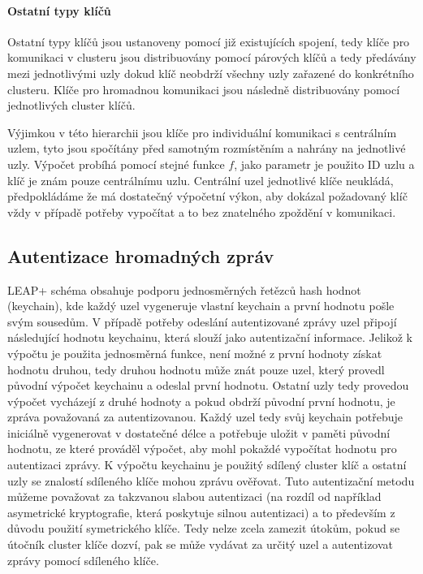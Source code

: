 \documentclass[11pt,final,twoside]{fithesis2}
\begin{document}
\paragraph{Ostatní typy klíčů} 
Ostatní typy klíčů jsou ustanoveny pomocí již existujících spojení, tedy klíče pro komunikaci v clusteru jsou distribuovány pomocí párových klíčů a tedy předávány mezi jednotlivými uzly dokud 
klíč neobdrží všechny uzly zařazené do konkrétního clusteru. Klíče pro hromadnou komunikaci jsou následně distribuovány pomocí jednotlivých cluster klíčů. 

Výjimkou v této hierarchii jsou klíče pro individuální komunikaci s centrálním uzlem, tyto jsou spočítány před samotným rozmístěním a nahrány na jednotlivé uzly. Výpočet probíhá pomocí stejné funkce $f$, 
jako parametr je použito ID uzlu a klíč je znám pouze centrálnímu uzlu. Centrální uzel jednotlivé klíče neukládá, předpokládáme že má dostatečný výpočetní výkon, aby dokázal požadovaný klíč vždy v případě 
potřeby vypočítat a to bez znatelného zpoždění v komunikaci.

\subsection{Autentizace hromadných zpráv}
LEAP+ schéma obsahuje podporu jednosměrných řetězců hash hodnot \cite{Lamport1981} (keychain), kde každý uzel vygeneruje vlastní keychain a první hodnotu pošle svým sousedům. 
V případě potřeby odeslání autentizované zprávy uzel připojí následující hodnotu keychainu, která slouží jako autentizační informace. Jelikož k výpočtu je použita jednosměrná funkce, není možné z první 
hodnoty získat hodnotu druhou, tedy druhou hodnotu může znát pouze uzel, který provedl původní výpočet keychainu a odeslal první hodnotu. Ostatní uzly tedy provedou výpočet vycházejí z druhé hodnoty a pokud 
obdrží původní první hodnotu, je zpráva považovaná za autentizovanou. Každý uzel tedy svůj keychain potřebuje iniciálně vygenerovat v dostatečné délce a potřebuje uložit v paměti původní hodnotu, ze které 
prováděl výpočet, aby mohl pokaždé vypočítat hodnotu pro autentizaci zprávy. K výpočtu keychainu je použitý sdílený cluster klíč a ostatní uzly se znalostí sdíleného klíče mohou zprávu ověřovat.
Tuto autentizační metodu můžeme považovat za takzvanou slabou autentizaci (na rozdíl od například asymetrické kryptografie, která poskytuje silnou autentizaci) a to především z důvodu použití symetrického 
klíče. Tedy nelze zcela zamezit útokům, pokud se útočník cluster klíče dozví, pak se může vydávat za určitý uzel a autentizovat zprávy pomocí sdíleného klíče.
\end{document}
